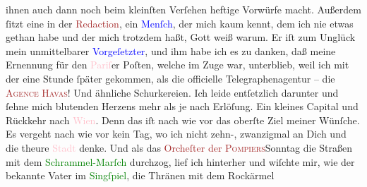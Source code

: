                ihnen auch {\pb}dann noch beim kleinſten Verſehen
               heftige Vorwürfe macht. Außerdem ſitzt eine \label{K_L02669-10v}\label{K_L02669-10h} in der \textcolor{brown}{Redaction}{}, ein \textcolor{blue}{Menſch}{}, der mich kaum kennt, dem ich nie
               etwas gethan habe und der mich trotzdem haßt, Gott weiß warum. Er iſt zum Unglück
               mein unmittelbarer \textcolor{blue}{Vorgeſetzter}{}, und ihm habe ich es zu danken, daß \strikeout{\textcolor{gray}{man}} meine Ernennung für den \textcolor{pink}{Pariſ}{}\ledrightnote{\textcolor{pink}{Paris}}er Poſten,
               welche im Zuge war, unterblieb, weil ich mit der \label{K_L02669-777v}\label{K_L02669-777h} eine Stunde ſpäter gekommen, als die officielle
               Telegraphenagentur – die \textsc{\textcolor{brown}{Agence Havas}{}\ledrightnote{\textcolor{brown}{Agence Havas}}}! Und ähnliche Schurkereien. Ich leide entſetzlich darunter und ſehne mich
               blutenden Herzens mehr als je nach Erlöſung. Ein kleines Capital und Rückkehr nach
                  \textcolor{pink}{Wien}{}\ledrightnote{\textcolor{pink}{Wien}}. Denn das iſt nach wie vor das oberſte
               Ziel meiner Wünſche. Es vergeht nach wie vor kein Tag, {\pb}wo ich nicht zehn-, zwanzigmal an Dich und die
               theure \textcolor{pink}{Stadt}{} denke. Und als das
                  \textcolor{brown}{Orcheſter der \textsc{Pompiers}}{}\ledrightnote{\textcolor{brown}{Orchestre municipal des pompiers de Bruxelles}}{ }Sonntag die Straßen mit dem \textcolor{green}{Schrammel-Marſch}{} durchzog, lief ich
               hinterher und wiſchte mir, wie der bekannte Vater im \textcolor{green}{Singſpiel}{}, die Thränen mit dem Rockärmel

